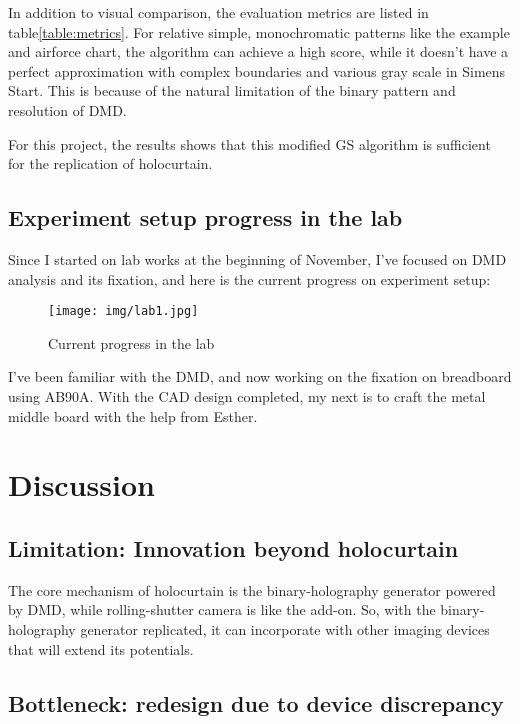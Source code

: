 \documentclass[10pt,journal,compsoc]{IEEEtran}
\begin{document}
In addition to visual comparison, the evaluation metrics are listed in table\ref{table:metrics}. For relative simple, monochromatic patterns like the example and airforce chart, the algorithm can achieve a high score, while it doesn't have a perfect approximation with complex boundaries and various gray scale in Simens Start. This is because of the natural limitation of the binary pattern and resolution of DMD.

For this project, the results shows that this modified GS algorithm is sufficient for the replication of holocurtain.

\subsection{Experiment setup progress in the lab}
\label{sec:4.3}

Since I started on lab works at the beginning of November, I've focused on DMD analysis and its fixation, and here is the current progress on experiment setup:
\begin{figure}[!h]
    \centering
    \texttt{[image: img/lab1.jpg]}
    \caption{Current progress in the lab}
    \label{fig:fig12}
\end{figure}

I've been familiar with the DMD, and now working on the fixation on breadboard using AB90A. With the CAD design completed, my next is to craft the metal middle board with the help from Esther.

\section{Discussion}
\label{sec:Discussion}

\subsection{Limitation: Innovation beyond holocurtain}
The core mechanism of holocurtain\cite{holocurtain} is the binary-holography generator powered by DMD, while rolling-shutter camera is like the add-on. So, with the binary-holography generator replicated, it can incorporate with other imaging devices that will extend its potentials.

\subsection{Bottleneck: redesign due to device discrepancy}
\end{document}
